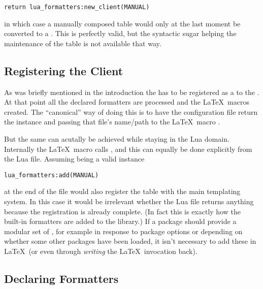 \documentclass[12pt]{scrartcl}
\begin{document}
\begin{verbatim}
return lua_formatters:new_client(MANUAL)
\end{verbatim}

\noindent in which case a manually composed table  would only at
the last moment be converted to a .  This is perfectly
valid, but the syntactic sugar helping the maintenance of the table is not
available that way.


\subsection{Registering the Client}
\label{sec:usage-registering-the-client}

As was briefly mentioned in the introduction the  has to be registered as a  to the .  At that point all the declared formatters are processed and the \LaTeX\ macros created.  The “canonical” way of doing this is to have the configuration file return the  instance and passing that file's name/path  to the \LaTeX\ macro \texttt{}.

But the same can acutally be achieved while staying in the Lua domain.
Internally the \LaTeX\ macro calls , and this can
equally be done explicitly from the Lua file.  Assuming  being a
valid  instance

\begin{verbatim}
lua_formatters:add(MANUAL)
\end{verbatim}

\noindent at the end of the file would also register the  table
with the main templating system.  In this case it would be irrelevant whether
the Lua file returns anything because the registration is already complete.  (In
fact this is exactly how the built-in formatters are added to the library.) If a
package should provide a modular set of ,
for example in response to package options or depending on whether some other
packages have been loaded, it isn't necessary to add these in \LaTeX\ (or even
through \emph{writing} the \LaTeX\ invocation back).


\subsection{Declaring Formatters}
\label{sec:usage:declaring-formatters}
\end{document}
